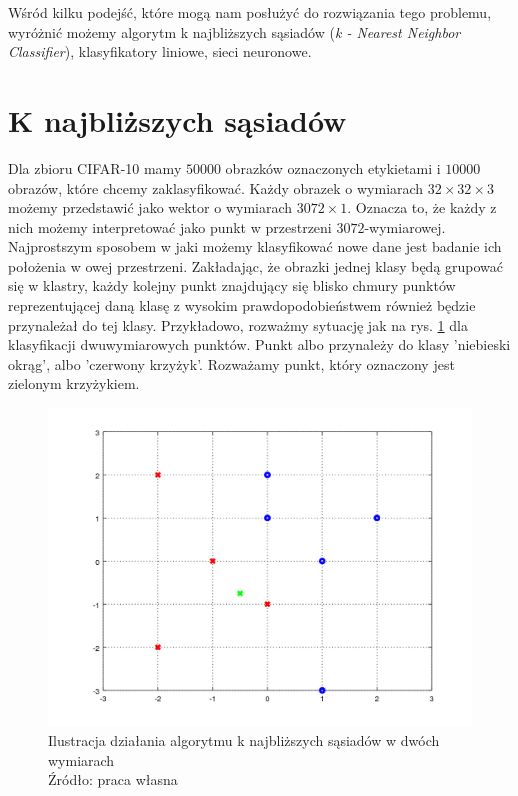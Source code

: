 Wśród kilku podejść, które mogą nam posłużyć do rozwiązania tego problemu, wyróżnić możemy algorytm k najbliższych sąsiadów (\textit{k - Nearest Neighbor Classifier}), klasyfikatory liniowe, sieci neuronowe.

\section{K najbliższych sąsiadów}\label{sec:knear}

Dla zbioru CIFAR-10 mamy $50000$ obrazków oznaczonych etykietami i $10000$ obrazów, które chcemy zaklasyfikować.
Każdy obrazek o wymiarach $32 \times 32 \times 3$ możemy przedstawić jako wektor o wymiarach $3072 \times 1$.
Oznacza to, że każdy z nich możemy interpretować jako punkt w przestrzeni $3072$-wymiarowej.
Najprostszym sposobem w jaki możemy klasyfikować nowe dane jest badanie ich położenia w owej przestrzeni.
Zakładając, że obrazki jednej klasy będą grupować się w klastry, każdy kolejny punkt znajdujący się blisko chmury punktów reprezentującej daną klasę z wysokim prawdopodobieństwem również będzie przynależał do tej klasy.
Przykładowo, rozważmy sytuację jak na rys. \ref{fig:knearest} dla klasyfikacji dwuwymiarowych punktów. Punkt albo przynależy do klasy 'niebieski okrąg', albo 'czerwony krzyżyk'. Rozważamy punkt, który oznaczony jest zielonym krzyżykiem.

\begin{figure}[h!tb]
	 \centering
	 \includegraphics[width = 1.0\linewidth]{img/knear}
	 \caption{Ilustracja działania algorytmu k najbliższych sąsiadów w dwóch wymiarach \\
              Źródło: praca własna}
	 \label{fig:knearest}
\end{figure}

